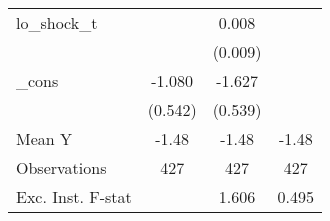 {\begin{tabular}{l*{3}{c}}
\addlinespace
lo\_shock\_t  &                     &       0.008         &                     \\
            &                     &     (0.009)         &                     \\
\addlinespace
\_cons      &      -1.080\sym{*}  &      -1.627\sym{***}&                     \\
            &     (0.542)         &     (0.539)         &                     \\
\midrule
Mean Y      &       -1.48         &       -1.48         &       -1.48         \\
Observations&         427         &         427         &         427         \\
Exc. Inst. F-stat&                     &       1.606         &       0.495         \\
\bottomrule
\end{tabular}
}
